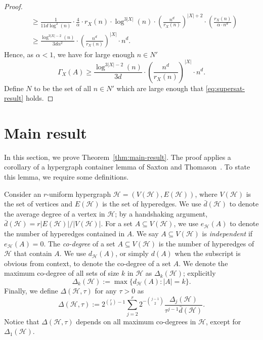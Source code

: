 \documentclass[12pt]{article}
\numberwithin{equation}{section}
\theoremstyle{definition}
\theoremstyle{remark}
\begin{document}
\begin{proof}
\begin{align*}
&\geq \frac{1}{11d\log^2(n)}\cdot \frac{4}{\alpha}\cdot r_X(n) \cdot \log^{3|X|}(n)\cdot \left(\frac{n^d}{r_X(n)} \right)^{|X|+2}\cdot\left(\frac{r_X(n)}{\alpha\cdot n^d}\right) \\
&\geq  \frac{\log^{3|X|-2}(n)}{3d\alpha^2}\cdot\left(\frac{n^d}{r_X(n)}\right)^{|X|}\cdot n^d. 
\end{align*}
Hence, as $\alpha < 1$, we have for large enough $n \in N'$
\begin{equation}\label{eq:supersat-result}
\Gamma_X(A) \geq \frac{\log^{3|X|-2}(n)}{3d}\cdot\left(\frac{n^d}{r_X(n)}\right)^{|X|}\cdot n^d. 
\end{equation}
Define $N$ to be the set of all $n\in N'$ which are large enough that \eqref{eq:supersat-result} holds. 
\end{proof}

    
\section{Main result}\label{sect:mainresult}

In this section, we prove Theorem~\ref{thm:main-result}. The proof applies a corollary of a hypergraph container lemma of Saxton and Thomason~\cite{saxton}. To state this lemma, we require some definitions.  

Consider an $r$-uniform hypergraph $\mathcal{H} = (V(\mathcal{H}), E(\mathcal{H}))$, where $V(\mathcal{H})$ is the set of vertices and $E(\mathcal{H})$ is the set of hyperedges. We use $\bar{d}(\mathcal{H})$ to denote the average degree of a vertex in $\mathcal{H}$; by a handshaking argument, $\bar{d}(\mathcal{H})=r|E(\mathcal{H})|/|V(\mathcal{H})|$. For a set $A\subseteq V(\mathcal{H})$, we use $e_\mathcal{H}(A)$ to denote the number of hyperedges contained in $A$. We say $A \subseteq V(\mathcal{H})$ is \emph{independent} if $e_\mathcal{H}(A) = 0$. The \emph{co-degree} of a set $A \subseteq V(\mathcal{H})$ is the number of hyperedges of $\mathcal{H}$ that contain $A$. We use $d_{\mathcal{H}}(A)$, or simply $d(A)$ when the subscript is obvious from context, to denote the co-degree of a set $A$.  We denote the maximum co-degree of all sets of size $k$ in $\mathcal{H}$ as $\Delta_k(\mathcal{H})$; explicitly \[\Delta_k(\mathcal{H}) := \max\{d_{\mathcal{H}}(A): |A| = k\}.\] Finally, we define $\Delta(\mathcal{H}, \tau)$ for any $\tau > 0$ as \[\Delta(\mathcal{H}, \tau) := 2^{\binom{r}{2} - 1} \sum_{j=2}^r 2^{-\binom{j-1}{2}} \frac{\Delta_j(\mathcal{H})}{\tau^{j-1}\bar{d}(\mathcal{H})}. \] Notice that $\Delta(\mathcal{H}, \tau)$ depends on all maximum co-degrees in $\mathcal{H}$, except for $\Delta_1(\mathcal{H})$. 
\end{document}
